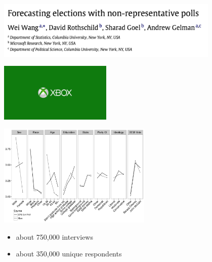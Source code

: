\documentclass[aspectratio=169]{beamer}
\begin{document}
\begin{frame}

\begin{center}
\includegraphics[width=0.8\textwidth]{figures/wang_forecasting_2015_title}
\end{center}

\begin{center}
\includegraphics[width=0.4\textwidth]{figures/xboxlogo}
\end{center}


\end{frame}
\begin{frame}

\begin{center}
\includegraphics[width=0.55\textwidth]{figures/bitbybit3-7_wang_forecasting_2015_fig1}
\end{center}

\begin{itemize}
\item about 750,000 interviews
\item about 350,000 unique respondents
\end{itemize}

\end{frame}
\end{document}
